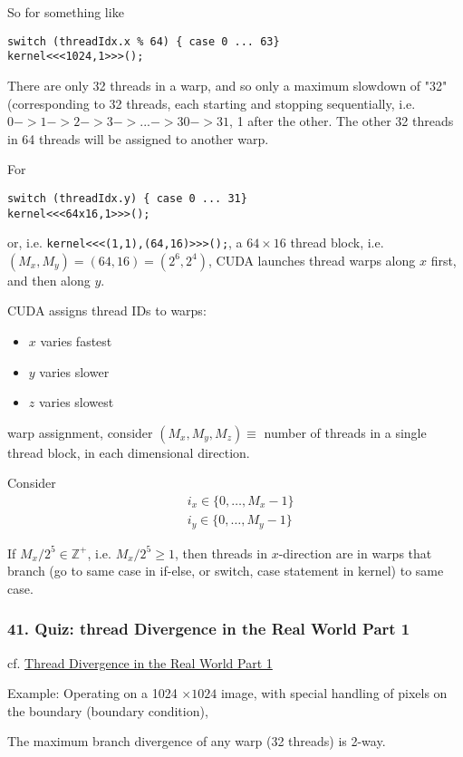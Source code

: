 \documentclass[10pt]{amsart}
\begin{document}
\begin{multicols*}{2}
So for something like 
\begin{lstlisting}
switch (threadIdx.x % 64) { case 0 ... 63}
kernel<<<1024,1>>>();
\end{lstlisting}
There are only 32 threads in a warp, and so only a maximum slowdown of "32" (corresponding to 32 threads, each starting and stopping sequentially, i.e. $0->1->2->3->...->30->31$, 1 after the other.  The other 32 threads in 64 threads will be assigned to another warp.  

For 
\begin{lstlisting}
switch (threadIdx.y) { case 0 ... 31}
kernel<<<64x16,1>>>();
\end{lstlisting}
or, i.e. \verb|kernel<<<(1,1),(64,16)>>>();|, a $64 \times 16$ thread block, i.e. $(M_x,M_y)=(64,16) = (2^6,2^4)$, CUDA launches thread warps along $x$ first, and then along $y$.  


CUDA assigns thread IDs to warps:

\begin{itemize}
\item $x$ varies fastest
\item $y$ varies slower
\item $z$ varies slowest
\end{itemize}
warp assignment, consider $(M_x,M_y,M_z) \equiv $ number of threads in a single thread block, in each dimensional direction.

Consider
\[
\begin{aligned}
  & i_x \in \lbrace 0 , \dots , M_x - 1 \rbrace \\ 
  & i_y \in \lbrace 0 , \dots , M_y - 1 \rbrace
  \end{aligned}
\]

If $M_x/2^5 \in \mathbb{Z}^+$, i.e. $M_x/2^5\geq 1$, then threads in $x$-direction are in warps that branch (go to same case in if-else, or switch, case statement in kernel) to same case.


\subsubsection{41. Quiz: thread Divergence in the Real World Part 1}
cf. \href{https://classroom.udacity.com/courses/cs344/lessons/109244577/concepts/1109210850923}{Thread Divergence in the Real World Part 1}

Example: Operating on a 1024 $\times 1024$ image, with special handling of pixels on the boundary (boundary condition), 

The maximum branch divergence of any warp (32 threads) is 2-way.  


\end{multicols*}
\end{document}

